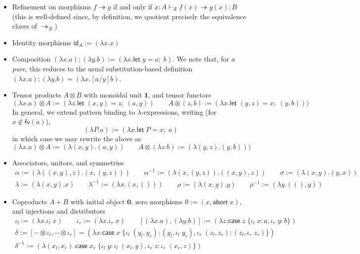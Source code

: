\documentclass[acmsmall,screen,review]{acmart}
\newcommand{\mc}[1]{\ensuremath{\mathcal{#1}}}
\newcommand{\mb}[1]{\ensuremath{\mathbf{#1}}}
\newcommand{\ms}[1]{\ensuremath{\mathsf{#1}}}
\newcommand{\lto}{:}
\newcommand{\linl}[1]{\iota_l\;{#1}}
\newcommand{\linr}[1]{\iota_r\;{#1}}
\newcommand{\labort}[1]{\ms{abort}\;{#1}}
\newcommand{\letexpr}[3]{\ensuremath{\ms{let}\;#1 = #2;\;#3}}
\newcommand{\caseexpr}[5]{\ms{case}\;#1\;\{\linl{#2} \lto #3, \linr{#4} \lto #5\}}
\newcommand{\tref}{\twoheadrightarrow}
\newcommand{\tmle}[5]{#1 \vdash_{#2} #3 \tref #4 : {#5}}
\begin{document}
\begin{itemize}
  \item Refinement on morphisms $f \tref g$ if and only if $\tmle{x : A}{\mc{R}}{f(x)}{g(x)}{B}$
  (this is well-defined since, by definition, we quotient precisely the equivalence clases of
  $\tref_{\mc{R}}$)
  \item Identity morphisms $\ms{id}_A := (\lambda x . x)$
  \item 
    Composition $(\lambda x. a) ; (\lambda y. b) := (\lambda x. \letexpr{y}{a}{b})$.
    We note that, for $a$ \emph{pure}, this reduces to the usual substitution-based definition
    $(\lambda x. a) ; (\lambda y. b) = (\lambda x . [a/y]b)$.
  \item Tensor products $A \otimes B$ with monoidal unit $\mb{1}$, and tensor functors
  $$
  (\lambda x. a) \otimes A := (\lambda z. \letexpr{(x, y)}{z}{(a, y)})
  \qquad
  A \otimes (z, b)
  := (\lambda x. \letexpr{(y, z)}{x}{(y, b)}))
  $$
  In general, we extend pattern binding to $\lambda$-expressions, writing 
  (for $x \notin \ms{fv}(a)$),
  $$
  (\lambda P . a) := (\lambda x. \letexpr{P}{x}{a})
  $$
  in which case we may rewrite the above as
  $$
  (\lambda x. a) \otimes A := (\lambda (x, y). (a, y))
  \qquad
  A \otimes (\lambda z. b) := (\lambda (y, z). (y, b)))
  $$
  \item Associators, unitors, and symmetries
  \begin{gather*}
    \alpha := (\lambda ((x, y), z) . (x, (y, z))) \qquad
    \alpha^{-1} := (\lambda (x, (y, z)) . ((x, y), z)) \qquad
    \sigma := (\lambda (x, y) . (y, x))
    \\
    \lambda := (\lambda (x, y) . x) \qquad
    \lambda^{-1} := (\lambda x. (x, ())) \qquad
    \rho := (\lambda (x, y) . y) \qquad
    \rho^{-1} := (\lambda y. ((), y))
  \end{gather*}
  \item Coproducts \(A + B\) with initial object $\mb{0}$, zero morphisms $0 := (x, \labort{x})$,
  and injections and distributors
  \begin{gather*}
    \iota_l := (\lambda x. \linl{x}) \qquad \iota_r := (\lambda x. \linr{x}) \qquad
    [(\lambda x. a), (\lambda y. b)] := (\lambda z. \caseexpr{z}{x}{a}{y}{b}) \\
    \delta := [- \otimes \iota_l, - \otimes \iota_r] = (\lambda x. \caseexpr{x}
                          {(y_l, y_r)}{(y_l, \linl{y_r})}
                          {(z_l, z_r)}{(z_l, \linr{z_r})}) \\
    \delta^{-1} := (\lambda (x_l, x_r). \caseexpr{x_r}{y}{\linl{(x_l, y)}}{z}{\linr{(x_r, z)}})

\end{gather*}
\end{itemize}
\end{document}
